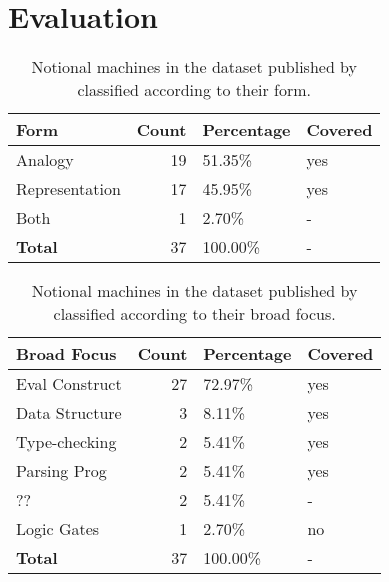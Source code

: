 \section{Evaluation}
\label{chr:evaluation}

\begin{table}[]
\begin{tabular}{|l||r|l|l|}
\hline
\textbf{Form}  & \textbf{Count} & \textbf{Percentage} & \textbf{Covered} \\
\hline
\hline
Analogy        & 19    & 51.35\%    & yes \\ \hline
Representation & 17    & 45.95\%    & yes \\ \hline
Both           & 1     & 2.70\%     & -   \\ \hline
\hline
\textbf{Total} & 37    & 100.00\%   & -   \\
\hline
\end{tabular}
\caption{Notional machines in the dataset published by \citet{fincherNotionalMachinesComputing2020} classified according to their form.}
\label{tab:nm-classification-form}
\end{table}

\begin{table}[]
\begin{tabular}{|l||r|l|l|}
\hline
\textbf{Broad Focus} & \textbf{Count} & \textbf{Percentage} & \textbf{Covered} \\
\hline
\hline
Eval Construct & 27    & 72.97\%   & yes \\ \hline
Data Structure & 3     & 8.11\%    & yes \\ \hline
Type-checking  & 2     & 5.41\%    & yes \\ \hline
Parsing Prog   & 2     & 5.41\%    & yes \\ \hline
??             & 2     & 5.41\%    & -   \\ \hline
Logic Gates    & 1     & 2.70\%    & no  \\ \hline
\hline
\textbf{Total} & 37    & 100.00\%  & -   \\
\hline
\end{tabular}
\caption{Notional machines in the dataset published by \citet{fincherNotionalMachinesComputing2020} classified according to their broad focus.}
\label{tab:nm-classification-broad-focus}
\end{table}

